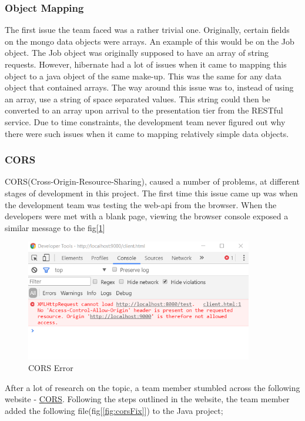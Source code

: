 \subsubsection{Object Mapping}
\label{sec:SystemEvaluationObjectMapping}
The first issue the team faced was a rather trivial one. Originally, certain fields on the mongo data objects were arrays. An example of this would be on the Job object. The Job object was originally supposed to have an array of string requests. However, hibernate had a lot of issues when it came to mapping this object to a java object of the same make-up.  This was the same for any data object that contained arrays. The way around this issue was to, instead of using an array, use a string of space separated values. This string could then be converted to an array upon arrival to the presentation tier from the RESTful service. Due to time constraints, the development team never figured out why there were such issues when it came to mapping relatively simple data objects.

\subsubsection{CORS}
\label{sec:SystemEvaluationCORS}
CORS(Cross-Origin-Resource-Sharing), caused a number of problems, at different stages of development in this project. The first time this issue came up was when the development team was testing the web-api from the browser. When the developers were met with a blank page, viewing the browser console exposed a similar message to the fig[\ref{fig:cors}]

\begin{figure}[H]
    \centering
    \includegraphics[width=\textwidth, height=150pt]{img/CORS.PNG}
    \caption{CORS Error}
    \label{fig:cors}
\end{figure}

\bigskip

After a lot of research on the topic, a team member stumbled across the following website - \href{https://www.baeldung.com/cors-in-jax-rs}{CORS}. Following the steps outlined in the website, the team member added the following file(fig[\ref{fig:corsFix}]) to the Java project;

